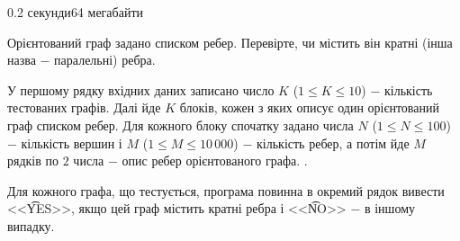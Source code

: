 \begin{problem}{}{}{}{0.2 секунди}{64 мегабайти}

Орієнтований граф задано списком ребер. 
Перевірте, чи містить він кратні (інша назва $-$ паралельні) ребра.

\InputFile
У першому рядку вхідних даних записано число $K$ ($1 \le K \le 10$) $-$ кількість тестованих графів. 
Далі йде $K$ блоків, кожен з яких описує один орієнтований граф списком ребер. 
Для кожного блоку спочатку задано числа $N$ ($1 \le N \le 100$) $-$ кількість вершин і $M$ ($1 \le M \le 10\,000$) $-$
кількість ребер, а потім йде $M$ рядків по $2$ числа $-$ опис ребер орієнтованого графа.
.

\OutputFile
Для кожного графа, що тестується, програма повинна в окремий рядок вивести <<{\t{YES}}>>,  якщо цей граф
містить кратні ребра і <<{\t{NO}}>> $-$ в іншому випадку.

\Example

\begin{example}
%
\end{example}

\end{problem}

